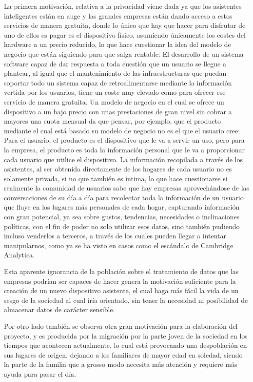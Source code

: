 La primera motivación, relativa a la privacidad viene dada ya que los asistentes inteligentes están en auge y las grandes empresas están dando acceso a estos servicios de manera gratuita, donde lo único que hay que hacer para disfrutar de uno de ellos es pagar es el dispositivo físico, asumiendo únicamente los costes del hardware a un precio reducido, lo que hace cuestionar la idea del modelo de negocio que están siguiendo para que salga rentable: El desarrollo de un sistema software capaz de dar respuesta a toda cuestión que un usuario se llegue a plantear, al igual que el mantenimiento de las infraestructuras que puedan soportar todo un sistema capaz de retroalimentarse mediante la información vertida por los usuarios, tiene un coste muy elevado como para ofrecer ese servicio de manera gratuita. Un modelo de negocio en el cual  se ofrece un dispositivo a un bajo precio con unas prestaciones de gran nivel sin cobrar a mayores una cuota mensual da que pensar, por ejemplo, que el producto mediante el cual está basado su modelo de negocio no es el que el usuario cree: Para el usuario, el producto es el dispositivo que le va a servir un uso, pero para la empresa, el producto es toda la información personal que le va a proporcionar cada usuario que utilice el dispositivo. La información recopilada a través de los asistentes, al ser obtenida directamente de los hogares de cada usuario no es solamente privada, si no que también es íntima, lo que hace cuestionarse si realmente la comunidad de usuarios sabe que hay empresas aprovechándose de las conversaciones de su día a día para recolectar toda la información de un usuario que fluye en los lugares más personales de cada hogar, capturando información con gran potencial, ya sea sobre gustos, tendencias, necesidades o inclinaciones políticas, con el fin de poder no solo utilizar esos datos, sino también pudiendo incluso venderlos a terceros, a través de los cuales pueden llegar a intentar manipularnos, como ya se ha visto en casos como el escándalo de Cambridge Analytica.~\cite{cambridge} 

Esta aparente ignorancia de la población sobre el tratamiento de datos que las empresas podrían ser capaces de hacer genera la motivación suficiente para la creación de un nuevo dispositivo asistente, el cual haga más fácil la vida de un sesgo de la sociedad al cual iría orientado, sin tener la necesidad ni posibilidad de almacenar datos de carácter sensible.

Por otro lado también se observa otra gran motivación para la elaboración del proyecto, y es producida por la migración por la parte joven de la sociedad en los tiempos que acontecen actualmente, lo cual está provocando una despoblación en sus lugares de origen, dejando a los familiares de mayor edad en soledad, siendo la parte de la familia que a grosso modo necesita más atención y requiere más ayuda para pasar el día.

